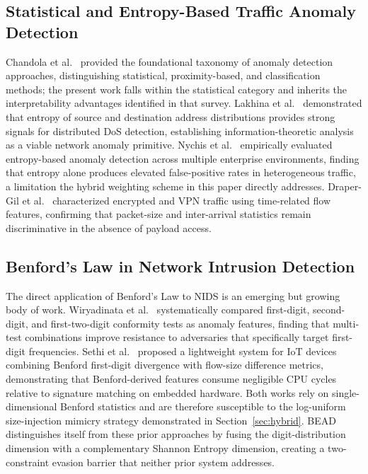 \documentclass[conference]{IEEEtran}
\begin{document}
\subsection{Statistical and Entropy-Based Traffic Anomaly Detection}

Chandola et al.~\cite{b7} provided the foundational taxonomy of anomaly
detection approaches, distinguishing statistical, proximity-based, and
classification methods; the present work falls within the statistical
category and inherits the interpretability advantages identified in that
survey. Lakhina et al.~\cite{b8} demonstrated that entropy of source and
destination address distributions provides strong signals for distributed
DoS detection, establishing information-theoretic analysis as a viable
network anomaly primitive. Nychis et al.~\cite{b11} empirically evaluated
entropy-based anomaly detection across multiple enterprise environments,
finding that entropy alone produces elevated false-positive rates in
heterogeneous traffic, a limitation the hybrid weighting scheme in this
paper directly addresses. Draper-Gil et al.~\cite{b10} characterized
encrypted and VPN traffic using time-related flow features, confirming that
packet-size and inter-arrival statistics remain discriminative in the
absence of payload access.

\subsection{Benford's Law in Network Intrusion Detection}

The direct application of Benford's Law to NIDS is an emerging but
growing body of work. Wiryadinata et al.~\cite{b25} systematically
compared first-digit, second-digit, and first-two-digit conformity
tests as anomaly features, finding that multi-test combinations improve
resistance to adversaries that specifically target first-digit
frequencies. Sethi et al.~\cite{b26} proposed a lightweight system for
IoT devices combining Benford first-digit divergence with flow-size
difference metrics, demonstrating that Benford-derived features consume
negligible CPU cycles relative to signature matching on embedded
hardware. Both works rely on single-dimensional Benford statistics and
are therefore susceptible to the log-uniform size-injection mimicry
strategy demonstrated in Section~\ref{sec:hybrid}. BEAD distinguishes
itself from these prior approaches by fusing the digit-distribution
dimension with a complementary Shannon Entropy dimension, creating a
two-constraint evasion barrier that neither prior system addresses.
\end{document}
